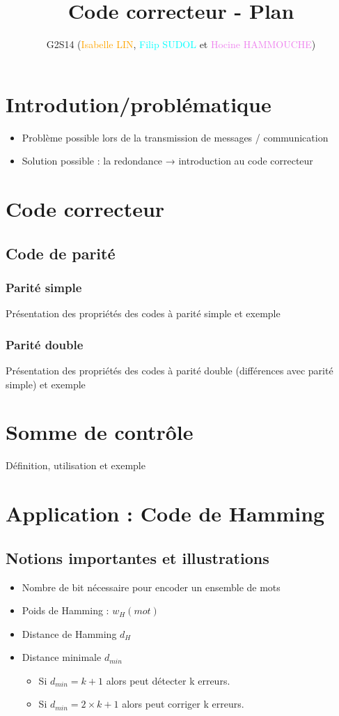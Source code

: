 \documentclass[a4paper, 12pt]{article}
\title{\vspace{-36pt}Code correcteur - Plan}
\author{G2S14 \small(\textcolor{orange}{Isabelle LIN}, \textcolor{cyan}{Filip SUDOL} et \textcolor{violet}{Hocine HAMMOUCHE})\vspace{-4cm}}
\date{}
\begin{document}
	\maketitle
	\color{violet}
	\section*{\vspace{-16pt}Introdution/problématique}
		\begin{itemize}
			\item Problème possible lors de la transmission de messages / communication
			\item Solution possible : la redondance → introduction au code correcteur
		\end{itemize}
	\color{orange}
	\section{Code correcteur}
		\subsection{Code de parité}
			\subsubsection{Parité simple}
			Présentation des propriétés des codes à parité simple et exemple
			\subsubsection{Parité double}
			Présentation des propriétés des codes à parité double (différences avec parité simple) et exemple
	\color{violet}		
	\section{Somme de contrôle}
		Définition, utilisation et exemple
	\color{cyan}	
	\section{Application : Code de Hamming}
		\subsection{Notions importantes et illustrations}
			\begin{itemize}
				\item Nombre de bit nécessaire pour encoder un ensemble de mots
				\item Poids de Hamming : $w_{H}(mot)$
				\item Distance de Hamming $d_{H}$
				\item Distance minimale $d_{min}$
					\begin{itemize}
						\item Si $d_{min} = k + 1$ alors peut détecter k erreurs.
						\item Si $d_{min} = 2 \times k + 1$ alors peut corriger k erreurs.
					\end{itemize}
			\end{itemize}	
\end{document}
